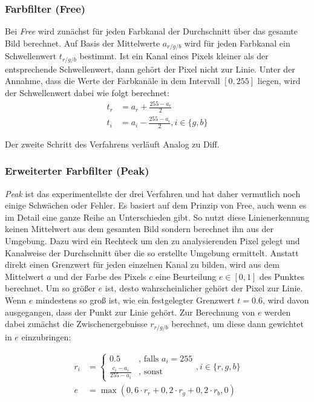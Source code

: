 \documentclass[ngerman,a4paper,parskip=half]{scrartcl}
\begin{document}
\subsubsection{Farbfilter (Free)}

Bei \emph{Free} wird zunächst für jeden Farbkanal der Durchschnitt über das gesamte Bild berechnet. Auf Basis der Mittelwerte $a_{r/g/b}$ wird für jeden Farbkanal ein Schwellenwert $t_{r/g/b}$ bestimmt. Ist ein Kanal eines Pixels kleiner als der entsprechende Schwellenwert, dann gehört der Pixel nicht zur Linie. Unter der Annahme, dass die Werte der Farbkanäle in dem Intervall $[0,255]$ liegen, wird der Schwellenwert dabei wie folgt berechnet:
\begin{align*}
	t_r &= a_r + \frac{255 - a_r}{2}\\
	t_i &= a_i - \frac{255 - a_i}{2}, i \in \{g,b\}
\end{align*}

Der zweite Schritt des Verfahrens verläuft Analog zu Diff.

\subsubsection{Erweiterter Farbfilter (Peak)}

\emph{Peak} ist das experimentellste der drei Verfahren und hat daher vermutlich noch einige Schwächen oder Fehler. Es basiert auf dem Prinzip von Free, auch wenn es im Detail eine ganze Reihe an Unterschieden gibt. So nutzt diese Linienerkennung keinen Mittelwert aus dem gesamten Bild sondern berechnet ihn aus der Umgebung. Dazu wird ein Rechteck um den zu analysierenden Pixel gelegt und Kanalweise der Durchschnitt über die so erstellte Umgebung ermittelt. Anstatt direkt einen Grenzwert für jeden einzelnen Kanal zu bilden, wird aus dem Mittelwert $a$ und der Farbe des Pixels $c$ eine Beurteilung $e \in [0, 1]$ des Punktes berechnet. Um so größer $e$ ist, desto wahrscheinlicher gehört der Pixel zur Linie. Wenn $e$ mindestens so groß ist, wie ein festgelegter Grenzwert $t=0.6$, wird davon ausgegangen, dass der Punkt zur Linie gehört. Zur Berechnung von $e$ werden dabei zunächst die Zwischenergebnisse $r_{r/g/b}$ berechnet, um diese dann gewichtet in $e$ einzubringen:

\begin{align*}
	r_i &= \begin{cases}
	0.5                         &\text{, falls } a_i = 255\\
	\frac{c_i - a_i}{255 - a_i} &\text{, sonst}
	\end{cases}, i \in \{r,g,b\}\\
	e &= \max(0,6 \cdot r_r + 0,2 \cdot r_g + 0,2 \cdot r_b, 0)
\end{align*}
\end{document}
